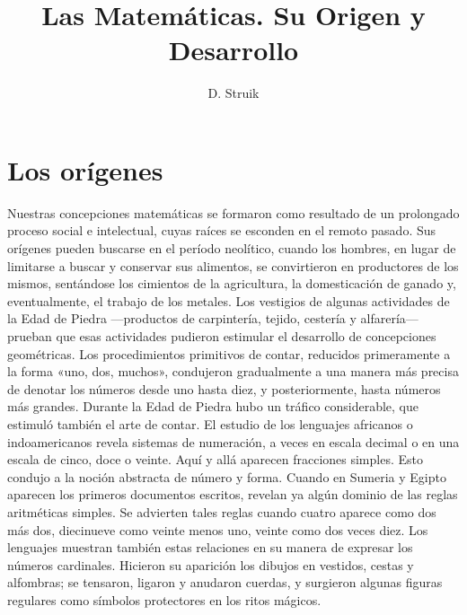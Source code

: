 \documentclass[a4paper, 12pt]{article}
\title{Las Matemáticas. Su Origen y Desarrollo}
\author{D. Struik}
\date{}
\begin{document}
\begin{tcolorbox}[colback=blue!5!white,colframe=blue!75!black]

\vspace{-1.8cm}
\textbf \maketitle

\end{tcolorbox}

\bigskip

\tableofcontents

\newpage

\section*{Los orígenes}

\setcounter{page}{1}

Nuestras concepciones matemáticas se formaron como resultado de un prolongado
proceso social e intelectual, cuyas raíces se esconden en el remoto pasado. Sus
orígenes pueden buscarse en el período neolítico, cuando los hombres, en lugar
de limitarse a buscar y conservar sus alimentos, se convirtieron en productores
de los mismos, sentándose los cimientos de la agricultura, la domesticación de
ganado y, eventualmente, el trabajo de los metales. Los vestigios de algunas
actividades de la Edad de Piedra ---productos de carpintería, tejido, cestería y
alfarería--- prueban que esas actividades pudieron estimular el desarrollo de
concepciones geométricas. Los procedimientos primitivos de contar, reducidos
primeramente a la forma  «uno, dos, muchos», condujeron gradualmente a una
manera más precisa de denotar los números desde uno hasta diez, y
posteriormente, hasta números más grandes. Durante la Edad de Piedra hubo un
tráfico considerable, que estimuló también el arte de contar. El estudio de los
lenguajes africanos o indoamericanos revela sistemas de numeración, a veces en
escala decimal o en una escala de cinco, doce o veinte. Aquí y allá aparecen
fracciones simples. Esto condujo a la noción abstracta de número y forma. Cuando
en Sumeria y Egipto aparecen los primeros documentos escritos, revelan ya algún
dominio de las reglas aritméticas simples. Se advierten tales reglas cuando
cuatro aparece como dos más dos, diecinueve como veinte menos uno, veinte como
dos veces diez. Los lenguajes muestran también estas relaciones en su manera de
expresar los números cardinales. Hicieron su aparición los dibujos en vestidos,
cestas y alfombras; se tensaron, ligaron y anudaron cuerdas, y surgieron algunas
figuras regulares como símbolos protectores en los ritos mágicos.
\end{document}
